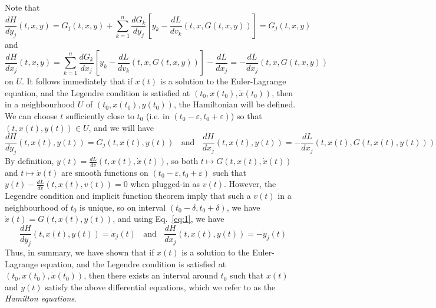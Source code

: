 \documentclass[aps,pra,showpacs,notitlepage,onecolumn,superscriptaddress,nofootinbib]{revtex4-1}
\theoremstyle{definition}
\begin{document}
Note that
\begin{equation}
  \label{eq:g}
  \frac{dH}{dy_j}(t, x, y) = G_j(t, x, y) + \sum_{k = 1}^{n} \frac{dG_k}{dy_j} \left[ y_k - \frac{dL}{dv_k}(t, x, G(t, x, y)) \right] = G_j(t, x, y)
  \end{equation}
and
\begin{equation}
  \label{eq:l}
  \frac{dH}{dx_j}(t, x, y) = \sum_{k = 1}^{n} \frac{dG_k}{dx_j} \left[y_k - \frac{dL}{dv_k}(t, x, G(t, x, y))\right] - \frac{dL}{dx_j} = - \frac{dL}{dx_j}(t, x, G(t, x, y))
  \end{equation}
on $U$. It follows immediately that if $x(t)$ is a solution to the Euler-Lagrange equation, and the Legendre condition is satisfied at $(t_0, x(t_0), \dot{x}(t_0))$, then in a neighbourhood $U$
of $(t_0, x(t_0), y(t_0))$, the Hamiltonian will be defined. We can choose $t$ sufficiently close to $t_0$ (i.e. in $(t_0 - \varepsilon, t_0 + \varepsilon)$) so that $(t, x(t), y(t)) \in U$, and we will have
\begin{equation}
  \label{eq:2}
  \frac{dH}{dy_j}(t, x(t), y(t)) = G_j(t, x(t), y(t)) \ \ \ \ \text{and} \ \ \ \ \frac{dH}{dx_j}(t, x(t), y(t)) = -\frac{dL}{dx_j}(t, x(t), G(t, x(t), y(t)))
  \end{equation}
By definition, $y(t) = \frac{dL}{dv}(t, x(t), \dot{x}(t))$, so both $t \mapsto G(t, x(t), \dot{x}(t))$ and $t \mapsto \dot{x}(t)$ are smooth functions on $(t_0 - \varepsilon, t_0 + \varepsilon)$
such that $y(t) - \frac{dL}{dv}(t, x(t), v(t)) = 0$ when plugged-in as $v(t)$. However, the Legendre condition and implicit function theorem imply that such a $v(t)$ in a neighbourhood of $t_0$ is unique,
so on interval $(t_0 - \delta, t_0 + \delta)$, we have $\dot{x}(t) = G(t, x(t), y(t))$, and using Eq.~\eqref{eq:1}, we have
\begin{equation}
  \label{eq:3}
  \frac{dH}{dy_j}(t, x(t), y(t)) = \dot{x}_j(t) \ \ \ \ \text{and} \ \ \ \ \frac{dH}{dx_j}(t, x(t), y(t)) = -\dot{y}_j(t)
\end{equation}
Thus, in summary, we have shown that if $x(t)$ is a solution to the Euler-Lagrange equation, and the Legendre condition is satisfied at $(t_0, x(t_0), \dot{x}(t_0))$, then
there exists an interval around $t_0$ such that $x(t)$ and $y(t)$ satisfy the above differential equations, which we refer to as the \emph{Hamilton equations}.
\end{document}
